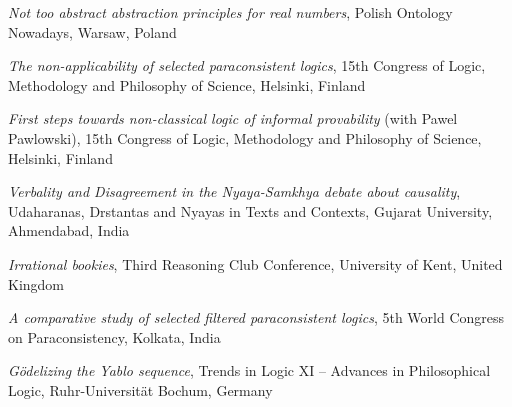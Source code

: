 \documentclass[10pt, a4paper]{article}
\newcommand{\years}[1]{\marginnote{\normalsize #1}}
\begin{document}
\vspace{0.5mm}


\emph{Not too abstract abstraction principles for real numbers}, Polish Ontology Nowadays,  Warsaw, Poland


\vspace{0.5mm}

 \years{2015} \emph{The non-applicability of selected paraconsistent logics}, 15th Congress of Logic, Methodology and Philosophy of Science,  Helsinki, Finland



\vspace{0.5mm}

 \emph{First steps towards non-classical logic of informal provability} (with Pawel Pawlowski), 15th Congress of Logic, Methodology and Philosophy of Science,  Helsinki, Finland





\vspace{0.5mm}


\years{2014} \emph{Verbality and Disagreement in the Nyaya-Samkhya debate about causality}, Udaharanas, Drstantas and Nyayas in Texts and Contexts,  Gujarat University, Ahmendabad, India



\vspace{0.5mm}

 \emph{Irrational bookies}, Third Reasoning Club Conference, University of Kent, United Kingdom


\vspace{0.5mm}


 \emph{A comparative study of selected filtered paraconsistent logics}, 5th World Congress on Paraconsistency,  Kolkata, India


\vspace{0.5mm}






\years{2012} \emph{G{\"o}delizing the Yablo sequence}, Trends in Logic XI -- Advances in Philosophical Logic,  Ruhr-Uni\-ver\-si\-t{\"a}t Bochum, Germany
\end{document}
